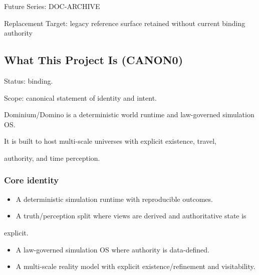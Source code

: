 \documentclass[9pt,a4paper,openany]{book}
\begin{document}
Future Series: DOC-\allowbreak{}ARCHIVE

Replacement Target: legacy reference surface retained without current binding authority


\subsection{What This Project Is (CANON0)}





Status: binding.\allowbreak{}



Scope: canonical statement of identity and intent.\allowbreak{}






Dominium/\allowbreak{}Domino is a deterministic world runtime and law-\allowbreak{}governed simulation OS.\allowbreak{}



It is built to host multi-\allowbreak{}scale universes with explicit existence, travel,



authority, and time perception.\allowbreak{}






\subsubsection{Core identity}


\begin{itemize}
\item A deterministic simulation runtime with reproducible outcomes.\allowbreak{}
\end{itemize}


\begin{itemize}
\item A truth/\allowbreak{}perception split where views are derived and authoritative state is
\end{itemize}


explicit.\allowbreak{}



\begin{itemize}
\item A law-\allowbreak{}governed simulation OS where authority is data-\allowbreak{}defined.\allowbreak{}
\end{itemize}


\begin{itemize}
\item A multi-\allowbreak{}scale reality model with explicit existence/\allowbreak{}refinement and visitability.\allowbreak{}
\end{itemize}
\end{document}
